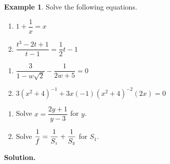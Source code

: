 \documentclass[11pt]{article}
\theoremstyle{definition}  %
\newtheorem{ex}{\bf Example}
\newcounter{HW}
\begin{document}
\pagebreak

\begin{ex}\label{rateqnreviewex} Solve the following equations.

\begin{multicols}{2}
\begin{enumerate}

\item  $1 + \dfrac{1}{x} = x$

\item  $\dfrac{t^3-2t+1}{t-1} = \dfrac{1}{2}t-1$



\setcounter{HW}{\value{enumi}}
\end{enumerate}

\end{multicols}

\begin{multicols}{2}
\begin{enumerate}
\setcounter{enumi}{\value{HW}}


\item  $\dfrac{3}{1 - w\sqrt{2}} - \dfrac{1}{2w+5} = 0$

\item $3(x^2+4)^{-1} + 3x(-1)(x^2+4)^{-2}(2x) = 0$

\setcounter{HW}{\value{enumi}}
\end{enumerate}

\end{multicols}

\begin{multicols}{2}
\begin{enumerate}
\setcounter{enumi}{\value{HW}}

\item  Solve $x = \dfrac{2y+1}{y-3}$ for $y$. 

\item  Solve $\dfrac{1}{f} = \dfrac{1}{S_{\text{\tiny $1$}}} + \dfrac{1}{S_{\text{\tiny $2$}}}$ for $S_{1}$.

\setcounter{HW}{\value{enumi}}
\end{enumerate}

\end{multicols}

{\bf Solution.} 

\begin{enumerate}


\end{enumerate}
\end{ex}
\end{document}
